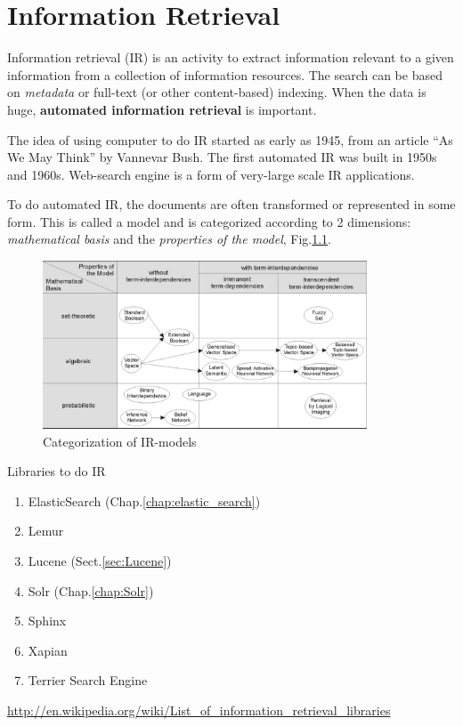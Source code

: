 \chapter{Information Retrieval}
\label{chap:Information_Retrieval}

Information retrieval (IR) is an activity to extract information relevant to a
given information from a collection of information resources. The search can be based
on {\it metadata} or full-text (or other content-based) indexing. When the data
is huge, {\bf automated information retrieval} is important.

The idea of using computer to do IR started as early as 1945, from an article
``As We May Think'' by Vannevar Bush. The first automated IR was built in 1950s
and 1960s. Web-search engine is a form of very-large scale IR applications.

To do automated IR, the documents are often transformed or represented in some
form. This is called a model and is categorized according to 2 dimensions: {\it
mathematical basis} and the {\it properties of the model},
Fig.\ref{fig:IR_classification}.

\begin{figure}[hbt]
  \centerline{\includegraphics[height=5cm,
    angle=0]{./images/IR_classification.eps}}
\caption{Categorization of IR-models}
\label{fig:IR_classification}
\end{figure}


Libraries to do IR
\begin{enumerate}
  \item ElasticSearch (Chap.\ref{chap:elastic_search})
  \item Lemur 
  \item Lucene (Sect.\ref{sec:Lucene})
  \item Solr (Chap.\ref{chap:Solr})
  \item Sphinx
  \item Xapian
  \item Terrier Search Engine
\end{enumerate}
\url{http://en.wikipedia.org/wiki/List_of_information_retrieval_libraries}